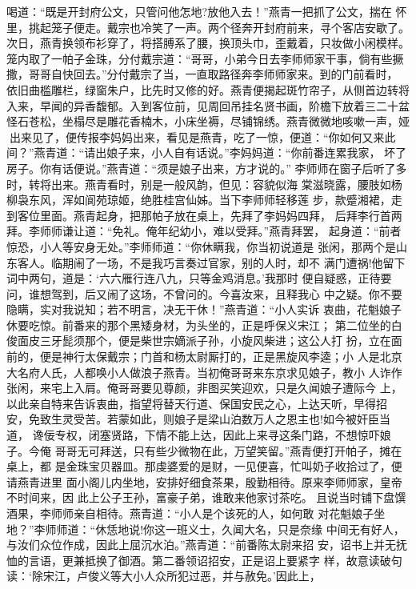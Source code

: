 喝道：“既是开封府公文，只管问他怎地?放他入去！”燕青一把抓了公文，揣在
怀里，挑起笼子便走。戴宗也冷笑了一声。两个径奔开封府前来，寻个客店安歇了。
次日，燕青换领布衫穿了，将搭膊系了腰，换顶头巾，歪戴着，只妆做小闲模样。
笼内取了一帕子金珠，分付戴宗道：“哥哥，小弟今日去李师师家干事，倘有些撅
撒，哥哥自快回去。”分付戴宗了当，一直取路径奔李师师家来。到的门前看时，
依旧曲槛雕栏，绿窗朱户，比先时又修的好。燕青便揭起斑竹帘子，从侧首边转将
入来，早闻的异香馥郁。入到客位前，见周回吊挂名贤书画，阶檐下放着三二十盆
怪石苍松，坐榻尽是雕花香楠木，小床坐褥，尽铺锦绣。燕青微微地咳嗽一声，娅
出来见了，便传报李妈妈出来，看见是燕青，吃了一惊，便道：“你如何又来此
间？”燕青道：“请出娘子来，小人自有话说。”李妈妈道：“你前番连累我家，
坏了房子。你有话便说。”燕青道：“须是娘子出来，方才说的。”
李师师在窗子后听了多时，转将出来。燕青看时，别是一般风韵，但见：容貌似海
棠滋晓露，腰肢如杨柳袅东风，浑如阆苑琼姬，绝胜桂宫仙姊。当下李师师轻移莲
步，款蹙湘裙，走到客位里面。燕青起身，把那帕子放在桌上，先拜了李妈妈四拜，
后拜李行首两拜。李师师谦让道：“免礼。俺年纪幼小，难以受拜。”燕青拜罢，
起身道：“前者惊恐，小人等安身无处。”李师师道：“你休瞒我，你当初说道是
张闲，那两个是山东客人。临期闹了一场，不是我巧言奏过官家，别的人时，却不
满门遭祸!他留下词中两句，道是：‘六六雁行连八九，只等金鸡消息。’我那时
便自疑惑，正待要问，谁想驾到，后又闹了这场，不曾问的。今喜汝来，且释我心
中之疑。你不要隐瞒，实对我说知；若不明言，决无干休！”燕青道：“小人实诉
衷曲，花魁娘子休要吃惊。前番来的那个黑矮身材，为头坐的，正是呼保义宋江；
第二位坐的白俊面皮三牙髭须那个，便是柴世宗嫡派子孙，小旋风柴进；这公人打
扮，立在面前的，便是神行太保戴宗；门首和杨太尉厮打的，正是黑旋风李逵；小
人是北京大名府人氏，人都唤小人做浪子燕青。当初俺哥哥来东京求见娘子，教小
人诈作张闲，来宅上入肩。俺哥哥要见尊颜，非图买笑迎欢，只是久闻娘子遭际今
上，以此亲自特来告诉衷曲，指望将替天行道、保国安民之心，上达天听，早得招
安，免致生灵受苦。若蒙如此，则娘子是梁山泊数万人之恩主也!如今被奸臣当道，
谗佞专权，闭塞贤路，下情不能上达，因此上来寻这条门路，不想惊吓娘子。今俺
哥哥无可拜送，只有些少微物在此，万望笑留。”燕青便打开帕子，摊在桌上，都
是金珠宝贝器皿。那虔婆爱的是财，一见便喜，忙叫奶子收拾过了，便请燕青进里
面小阁儿内坐地，安排好细食茶果，殷勤相待。原来李师师家，皇帝不时间来，因
此上公子王孙，富豪子弟，谁敢来他家讨茶吃。
且说当时铺下盘馔酒果，李师师亲自相待。燕青道：“小人是个该死的人，如何敢
对花魁娘子坐地？”李师师道：“休恁地说!你这一班义士，久闻大名，只是奈缘
中间无有好人，与汝们众位作成，因此上屈沉水泊。”燕青道：“前番陈太尉来招
安，诏书上并无抚恤的言语，更兼抵换了御酒。第二番领诏招安，正是诏上要紧字
样，故意读破句读：‘除宋江，卢俊义等大小人众所犯过恶，并与赦免。’因此上，
